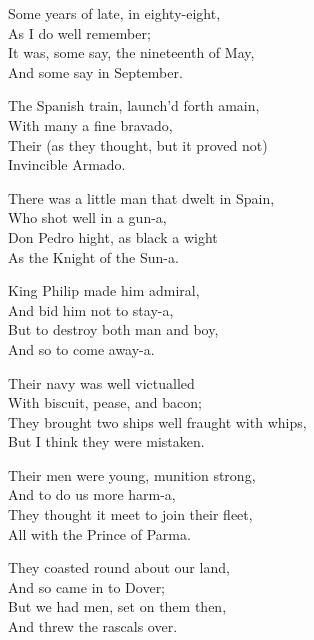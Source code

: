 \settowidth{\versewidth}{They brought two ships well fraught with whips,}
\begin{dcverse}\begin{altverse}
Some years of late, in eighty-eight,\\
As I do well remember;\\
It was, some say, the nineteenth of May,\\
And some say in September.
\end{altverse}

\begin{altverse}
The Spanish train, launch’d forth amain,\\
With many a fine bravado,\\
Their (as they thought, but it proved not)\\
Invincible Armado.
\end{altverse}

\begin{altverse}
There was a little man that dwelt in Spain,\\
Who shot well in a gun-a,\\
Don Pedro hight, as black a wight\\
As the Knight of the Sun-a.
\end{altverse}

\begin{altverse}
King Philip made him admiral,\\
And bid him not to stay-a,\\
But to destroy both man and boy,\\
And so to come away-a.
\end{altverse}

\begin{altverse}
Their navy was well victualled\\
With biscuit, pease, and bacon;\\
They brought two ships well fraught with whips,\\
But I think they were mistaken.
\end{altverse}

\begin{altverse}
Their men were young, munition strong,\\
And to do us more harm-a,\\
They thought it meet to join their fleet,\\
All with the Prince of Parma.
\end{altverse}

\begin{altverse}
They coasted round about our land,\\
And so came in to Dover;\\
But we had men, set on them then,\\
And threw the rascals over.
\end{altverse}


\end{dcverse}
